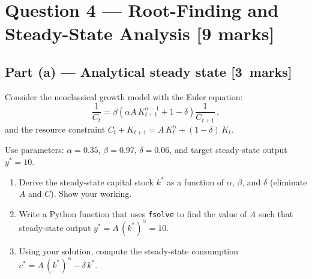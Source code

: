 \documentclass[11pt,a4paper]{article}
\newcommand{\mkpts}[1]{\hfill\textbf{[#1~marks]}}
\begin{document}
\newpage

\section*{Question 4 --- Root-Finding and Steady-State Analysis \hfill [9 marks]}

\subsection*{Part (a) --- Analytical steady state \mkpts{3}}

Consider the neoclassical growth model with the Euler equation:
\[
\frac{1}{C_t} = \beta\left(\alpha A\, K_{t+1}^{\alpha-1} + 1 - \delta\right)\frac{1}{C_{t+1}}\,,
\]
and the resource constraint $C_t + K_{t+1} = A\,K_t^\alpha + (1-\delta)\,K_t$.

Use parameters: $\alpha = 0.35$, $\beta = 0.97$, $\delta = 0.06$, and target steady-state output $y^* = 10$.

\begin{enumerate}[label=(\roman*),nosep]
\item Derive the steady-state capital stock $k^*$ as a function of $\alpha$, $\beta$, and $\delta$ (eliminate $A$ and $C$).  Show your working.
\item Write a Python function that uses \texttt{fsolve} to find the value of $A$ such that steady-state output $y^* = A\,(k^*)^\alpha = 10$.
\item Using your solution, compute the steady-state consumption $c^* = A\,(k^*)^\alpha - \delta\,k^*$.
\end{enumerate}
\end{document}
